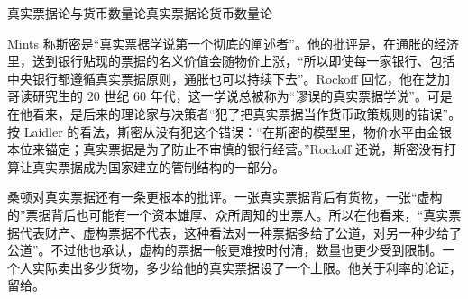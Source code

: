 
\begin{compare}{真实票据论与货币数量论}{真实票据论}{货币数量论}
\end{compare}

\begin{pitfall}[真实票据论是一条控制货币数量的规则]
Mints 称斯密是“真实票据学说第一个彻底的阐述者”\cite{rockoff2009}。他的批评是，在通胀的经济里，送到银行贴现的票据的名义价值会随物价上涨，“所以即使每一家银行、包括中央银行都遵循真实票据原则，通胀也可以持续下去”\cite{rockoff2009}。Rockoff 回忆，他在芝加哥读研究生的 20 世纪 60 年代，这一学说总被称为“谬误的真实票据学说”\cite{rockoff2009}。可是在他看来，是后来的理论家与决策者“犯了把真实票据当作货币政策规则的错误”。按 Laidler 的看法，斯密从没有犯这个错误：“在斯密的模型里，物价水平由金银本位来锚定；真实票据是为了防止不审慎的银行经营。”\cite{rockoff2009}Rockoff 还说，斯密没有打算让真实票据成为国家建立的管制结构的一部分\cite{rockoff2009}。
\end{pitfall}

桑顿对真实票据还有一条更根本的批评。一张真实票据背后有货物，一张“虚构的”票据背后也可能有一个资本雄厚、众所周知的出票人。所以在他看来，“真实票据代表财产、虚构票据不代表，这种看法对一种票据多给了公道，对另一种少给了公道”\cite{thornton1802}。不过他也承认，虚构的票据一般更难按时付清，数量也更少受到限制。一个人实际卖出多少货物，多少给他的真实票据设了一个上限\cite{thornton1802}。他关于利率的论证，留给。

